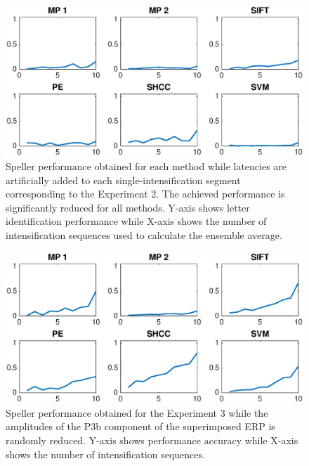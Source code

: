 \documentclass[brainsci,article,submit,moreauthors,pdftex,10pt,a4paper]{mdpi}
\begin{document}
\begin{figure}[H]
\centering
\includegraphics[width=15cm]{images/CrossPerformanceTestLatency.eps}
\caption{Speller performance obtained for each method while latencies are artificially added to each single-intensification segment corresponding to the Experiment 2.  The achieved performance is significantly reduced for all methods. Y-axis shows letter identification performance while X-axis shows the number of intensification sequences used to calculate the ensemble average.}
\label{fig:performancetestlatency}
\end{figure}


\begin{figure}[H]
\centering
\includegraphics[width=15cm]{images/CrossPerformanceTestAmplitude.eps}
\caption{Speller performance obtained for the Experiment 3 while the amplitudes of the P3b component of the superimposed ERP is randomly reduced. Y-axis shows performance accuracy while X-axis shows the number of intensification sequences.}
\label{fig:performancetestamplitude}
\end{figure}
\end{document}
